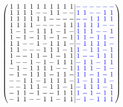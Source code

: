 \documentclass{beamer}
\newcommand{\bblue}[1]{\textcolor{blue}{#1}}
\begin{document}
\begin{frame}

  \[
    \arraycolsep=1.0pt\def\arraystretch{0.75}
    \left(
      \begin{array}{cccccccccc|cccccc}
        1&1&1&1&1&1&1&1&1&1&\bblue{-}&\bblue{-}&\bblue{-}&\bblue{-}&\bblue{-}&\bblue{-}\\
        1&1&1&1&-&-&1&1&-&-&\bblue{1}&\bblue{1}&\bblue{-}&\bblue{-}&\bblue{1}&\bblue{1}\\
        1&1&1&1&1&1&-&-&-&-&\bblue{-}&\bblue{-}&\bblue{1}&\bblue{1}&\bblue{1}&\bblue{1}\\
        1&1&1&1&-&-&-&-&1&1&\bblue{1}&\bblue{1}&\bblue{1}&\bblue{1}&\bblue{-}&\bblue{-}\\
        1&-&1&-&1&1&1&-&1&-&\bblue{1}&\bblue{1}&\bblue{1}&\bblue{-}&\bblue{-}&\bblue{1}\\
        1&-&1&-&1&1&-&1&-&1&\bblue{1}&\bblue{1}&\bblue{-}&\bblue{1}&\bblue{1}&\bblue{-}\\
        1&1&-&-&1&-&1&1&1&-&\bblue{-}&\bblue{1}&\bblue{1}&\bblue{1}&\bblue{1}&\bblue{-}\\
        1&1&-&-&-&1&1&1&-&1&\bblue{1}&\bblue{-}&\bblue{1}&\bblue{1}&\bblue{-}&\bblue{1}\\
        1&-&-&1&1&-&1&-&1&1&\bblue{1}&\bblue{-}&\bblue{-}&\bblue{1}&\bblue{1}&\bblue{1}\\
        1&-&-&1&-&1&-&1&1&1&\bblue{-}&\bblue{1}&\bblue{1}&\bblue{-}&\bblue{1}&\bblue{1}\\
        -&1&-&1&1&1&1&-&-&1&\bblue{1}&\bblue{1}&\bblue{1}&\bblue{-}&\bblue{1}&\bblue{-}\\
        -&1&-&1&1&1&-&1&1&-&\bblue{1}&\bblue{1}&\bblue{-}&\bblue{1}&\bblue{-}&\bblue{1}\\
        -&-&1&1&-&1&1&1&1&-&\bblue{1}&\bblue{-}&\bblue{1}&\bblue{1}&\bblue{1}&\bblue{-}\\
        -&-&1&1&1&-&1&1&-&1&\bblue{-}&\bblue{1}&\bblue{1}&\bblue{1}&\bblue{-}&\bblue{1}\\
        -&1&1&-&1&-&-&1&1&1&\bblue{1}&\bblue{-}&\bblue{1}&\bblue{-}&\bblue{1}&\bblue{1}\\
        -&1&1&-&-&1&1&-&1&1&\bblue{-}&\bblue{1}&\bblue{-}&\bblue{1}&\bblue{1}&\bblue{1}\\    
      \end{array}
    \right)
  \]
  
\end{frame}
\end{document}
